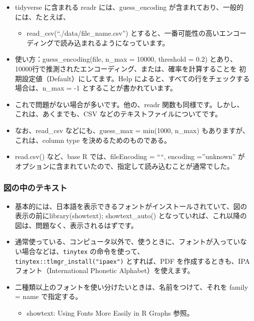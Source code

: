 \documentclass[
]{bxjsbook}
\providecommand{\tightlist}{%
  \setlength{\itemsep}{0pt}\setlength{\parskip}{0pt}}
\theoremstyle{definition}
\theoremstyle{definition}
\theoremstyle{definition}
\theoremstyle{definition}
\theoremstyle{remark}
\begin{document}
\begin{itemize}
\tightlist
\item
  tidyverse に含まれる readr には、guess\_encoding が含まれており、一般的には、たとえば、

  \begin{itemize}
  \tightlist
  \item
    read\_csv(``./data/file\_name.csv'') とすると、一番可能性の高いエンコーディングで読み込まれるようになっています。
  \end{itemize}
\item
  使い方：guess\_encoding(file, n\_max = 10000, threshold = 0.2) とあり、10000行で推測されたエンコーディング、または、確率を計算することを 初期設定値（Default）にしてます。Help によると、すべての行をチェックする場合は、n\_max = -1 とすることが書かれています。
\item
  これで問題がない場合が多いです。他の、readr 関数も同様です。しかし、これは、あくまでも、CSV などのテキストファイルについてです。
\item
  なお、read\_csv などにも、guess\_max = min(1000, n\_max) もありますが、これは、column type を決めるためのものである。
\item
  read.csv() など、base R では、fileEncoding = ````, encoding =''unknown'' がオプションに含まれていたので、指定して読み込むことが通常でした。
\end{itemize}

\hypertarget{ux56f3ux306eux4e2dux306eux30c6ux30adux30b9ux30c8}{%
\subsubsection{図の中のテキスト}\label{ux56f3ux306eux4e2dux306eux30c6ux30adux30b9ux30c8}}

\begin{itemize}
\tightlist
\item
  基本的には、日本語を表示できるフォントがインストールされていて、図の表示の前にlibrary(showtext); showtext\_auto() となっていれば、これ以降の図は、問題なく、表示されるはずです。
\item
  通常使っている、コンピュータ以外で、使うときに、フォントが入っていない場合などは、\texttt{tinytex} の命令を使って、\texttt{tinytex::tlmgr\_install("ipaex")} とすれば、PDF を作成するときも、IPA フォント（International Phonetic Alphabet）を使えます。
\item
  二種類以上のフォントを使い分けたいときは、名前をつけて、それを family = name で指定する。

  \begin{itemize}
  \tightlist
  \item
    showtext: Using Fonts More Easily in R Graphs 参照。
  \end{itemize}
\end{itemize}
\end{document}
